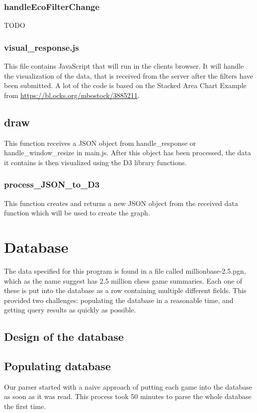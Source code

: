 \documentclass{article}
\begin{document}
\subsubsection*{handleEcoFilterChange}
TODO


\subsubsection{visual\_response.js}
This file contains JavaScript that will run in the clients browser. It will handle the visualization of the data, that is received from the server after
the filters have been submitted. A lot of the code is based on the Stacked Area
Chart Example from \url{https://bl.ocks.org/mbostock/3885211}.

\subsection*{draw}
This function receives a JSON object from handle\_response or handle\_window\_resize in main.js. After this object has been processed, the data it contains is then visualized using the D3 library functions.

\subsubsection*{process\_JSON\_to\_D3}
This function creates and returns a new JSON object from the received data function which will be used to create the graph.

\section{Database}
The data specified for this program is found in a file called
millionbase-2.5.pgn, which as the name suggest has 2.5 million chess game
summaries. Each one of these is put into the database as a row containing
multiple different fields.  This provided two challenges:  populating the
database in a reasonable time, and getting query results as quickly as
possible.

\subsection{Design of the database}

\subsection{Populating database}
Our parser started with a naive approach of putting each game into the
database as soon as it was read.  This process took 50 minutes to parse the
whole database the first time.
\end{document}
